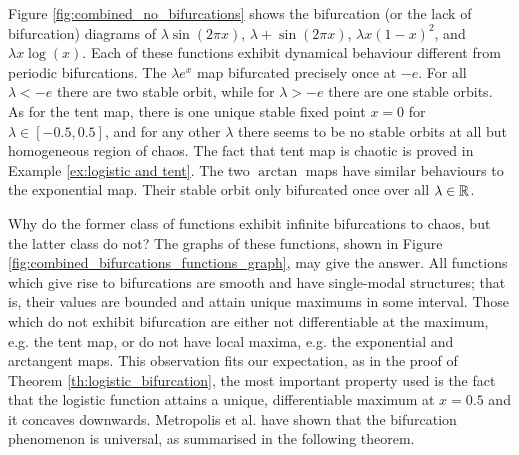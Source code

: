 Figure \ref{fig:combined_no_bifurcations} shows the bifurcation (or the lack of bifurcation) diagrams of $\lambda \sin(2\pi x)$, $\lambda + \sin(2\pi x)$, $\lambda x(1-x)^2$, and $\lambda x \log(x)$. 
Each of these functions exhibit dynamical behaviour different from periodic bifurcations.
The $\lambda e^x$ map bifurcated precisely once at $-e$. 
For all $\lambda < -e$ there are two stable orbit, while for $\lambda > -e$ there are one stable orbits.
As for the tent map, there is one unique stable fixed point $x=0$ for $\lambda \in [-0.5, 0.5]$, and for any other $\lambda$ there seems to be no stable orbits at all but homogeneous region of chaos. 
The fact that tent map is chaotic is proved in Example \ref{ex:logistic and tent}.
The two $\arctan$ maps have similar behaviours to the exponential map. 
Their stable orbit only bifurcated once over all $\lambda \in \mathbb{R}$.

Why do the former class of functions exhibit infinite bifurcations to chaos, but the latter class do not?
The graphs of these functions, shown in Figure \ref{fig:combined_bifurcations_functions_graph}, may give the answer. 
All functions which give rise to bifurcations are smooth and have single-modal structures; that is, their values are bounded and attain unique maximums in some interval. Those which do not exhibit bifurcation are either not differentiable at the maximum, e.g. the tent map, or do not have local maxima, e.g. the exponential and arctangent maps.
This observation fits our expectation, as in the proof of Theorem \ref{th:logistic_bifurcation}, the most important property used is the fact that the logistic function attains a unique, differentiable maximum at $x=0.5$ and it concaves downwards. 
Metropolis et al. \cite{metropolis2017finite} have shown that the bifurcation phenomenon is universal, as summarised in the following theorem.

